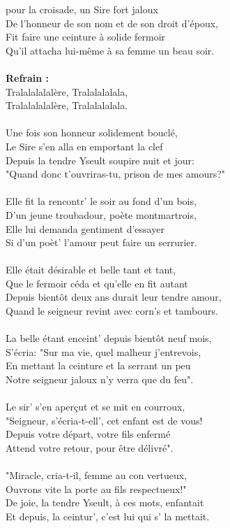 
 pour la croisade, un Sire fort jaloux
\\De l'honneur de son nom et de son droit d'époux,
\\Fit faire une ceinture à solide fermoir
\\Qu'il attacha lui-même à sa femme un beau soir.
\\\\\textbf{Refrain :}
\\Tralalalalalère, Tralalalalala,
\\Tralalalalalère, Tralalalalala.
\\\\Une fois son honneur solidement bouclé,
\\Le Sire s'en alla en emportant la clef
\\Depuis la tendre Yseult soupire nuit et jour:
\\"Quand donc t'ouvriras-tu, prison de mes amours?"
\\\\Elle fit la rencontr' le soir au fond d'un bois,
\\D'un jeune troubadour, poète montmartrois,
\\Elle lui demanda gentiment d'essayer
\\Si d'un poèt' l'amour peut faire un serrurier.
\\\\Elle était désirable et belle tant et tant,
\\Que le fermoir céda et qu'elle en fit autant
\\Depuis bientôt deux ans durait leur tendre amour,
\\Quand le seigneur revint avec corn's et tambours.
\\\\La belle étant enceint' depuis bientôt neuf mois,
\\S'écria: "Sur ma vie, quel malheur j'entrevois,
\\En mettant la ceinture et la serrant un peu
\\Notre seigneur jaloux n'y verra que du feu".
\\\\Le sir' s'en aperçut et se mit en courroux,
\\"Seigneur, s'écria-t-ell', cet enfant est de vous!
\\Depuis votre départ, votre fils enfermé
\\Attend votre retour, pour être délivré".
\\\\"Miracle, cria-t-il, femme au con vertueux,
\\Ouvrons vite la porte au fils respectueux!"
\\De joie, la tendre Yseult, à ces mots, enfantait
\\Et depuis, la ceintur', c'est lui qui s' la mettait.


\breakpage